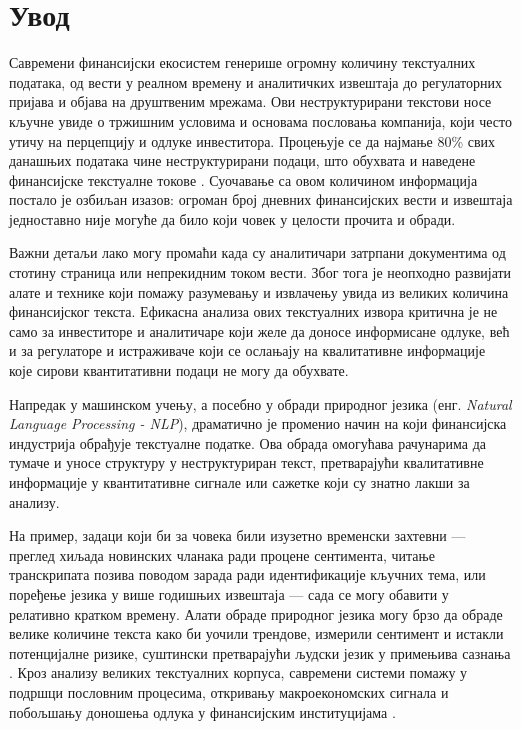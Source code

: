 \chapter{Увод}
\label{sec:1}

Савремени финансијски екосистем генерише огромну количину текстуалних података, од вести у реалном времену и аналитичких извештаја до регулаторних пријава и објава на друштвеним мрежама. Ови неструктурирани текстови носе кључне увиде о тржишним условима и основама пословања компанија, који често утичу на перцепцију и одлуке инвеститора. Процењује се да најмање 80\% свих данашњих података чине неструктурирани подаци, што обухвата и наведене финансијске текстуалне токове \cite{rocha_discovering_2021}. Суочавање са овом количином информација постало је озбиљан изазов: огроман број дневних финансијских вести и извештаја једноставно није могуће да било који човек у целости прочита и обради. 
\newline

Важни детаљи лако могу промаћи када су аналитичари затрпани документима од стотину страница или непрекидним током вести. Због тога је неопходно развијати алате и технике који помажу разумевању и извлачењу увида из великих количина финансијског текста. Ефикасна анализа ових текстуалних извора критична је не само за инвеститоре и аналитичаре који желе да доносе информисане одлуке, већ и за регулаторе и истраживаче који се ослањају на квалитативне информације које сирови квантитативни подаци не могу да обухвате.

Напредак у машинском учењу, а посебно у обради природног језика (енг. \textit{Natural Language Processing - NLP}), драматично је променио начин на који финансијска индустрија обрађује текстуалне податке. Ова обрада омогућава рачунарима да тумаче и уносе структуру у неструктуриран текст, претварајући квалитативне информације у квантитативне сигнале или сажетке који су знатно лакши за анализу. 
\newline

На пример, задаци који би за човека били изузетно временски захтевни — преглед хиљада новинских чланака ради процене сентимента, читање транскрипата позива поводом зарада ради идентификације кључних тема, или поређење језика у више годишњих извештаја — сада се могу обавити у релативно кратком времену. Алати обраде природног језика могу брзо да обраде велике количине текста како би уочили трендове, измерили сентимент и истакли потенцијалне ризике, суштински претварајући људски језик у примењива сазнања \cite{paro_ai_strategic_2023}. Кроз анализу великих текстуалних корпуса, савремени системи помажу у подршци пословним процесима, откривању макроекономских сигнала и побољшању доношења одлука у финансијским институцијама \cite{yang_evaluating_2025}.
\newline

